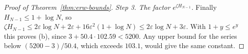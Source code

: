 \begin{proof}[Proof of Theorem~\ref{thm:erw-bounds}]
\emph{Step 3. The factor $e^{\zeta H_{N-1}}$.} Finally
$H_{N-1}\le1+\log N$, so
$\zeta H_{N-1}\le2\varepsilon\log N+2\varepsilon+16\varepsilon^2(1+\log N)
\le2\varepsilon\log N+3\varepsilon$. With $1+y\le e^y$ this proves (b),
since $3+50.4\cdot102.59<5200$. Any upper bound for the series below
$(5200-3)/50.4$, which exceeds $103.1$, would give the same constant.
\end{proof}
